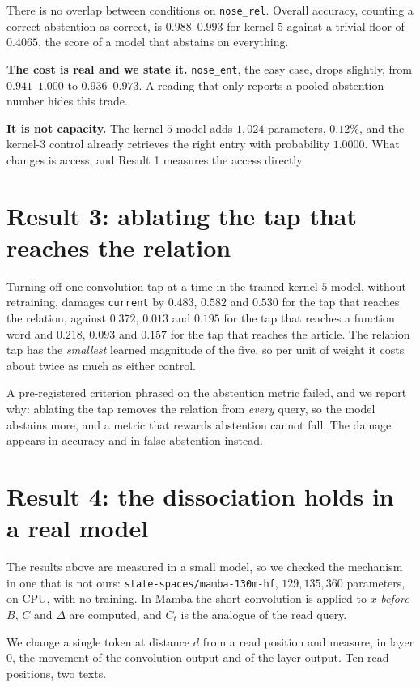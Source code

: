 \documentclass[10pt]{article}
\begin{document}
There is no overlap between conditions on \texttt{nose\_rel}. Overall accuracy, counting a correct
abstention as correct, is $0.988$--$0.993$ for kernel $5$ against a trivial floor of $0.4065$, the score
of a model that abstains on everything.

\textbf{The cost is real and we state it.} \texttt{nose\_ent}, the easy case, drops slightly, from
$0.941$--$1.000$ to $0.936$--$0.973$. A reading that only reports a pooled abstention number hides this
trade.

\textbf{It is not capacity.} The kernel-$5$ model adds $1{,}024$ parameters, $0.12\%$, and the kernel-$3$
control already retrieves the right entry with probability $1.0000$. What changes is access, and Result
1 measures the access directly.

\section{Result 3: ablating the tap that reaches the relation}

Turning off one convolution tap at a time in the trained kernel-$5$ model, without retraining, damages
\texttt{current} by $0.483$, $0.582$ and $0.530$ for the tap that reaches the relation, against $0.372$,
$0.013$ and $0.195$ for the tap that reaches a function word and $0.218$, $0.093$ and $0.157$ for the
tap that reaches the article. The relation tap has the \emph{smallest} learned magnitude of the five,
so per unit of weight it costs about twice as much as either control.

A pre-registered criterion phrased on the abstention metric failed, and we report why: ablating the tap
removes the relation from \emph{every} query, so the model abstains more, and a metric that rewards
abstention cannot fall. The damage appears in accuracy and in false abstention instead.

\section{Result 4: the dissociation holds in a real model}

The results above are measured in a small model, so we checked the mechanism in one that is not ours:
\texttt{state-spaces/mamba-130m-hf}, $129{,}135{,}360$ parameters, on CPU, with no training. In Mamba
the short convolution is applied to $x$ \emph{before} $B$, $C$ and $\Delta$ are computed, and $C_t$ is
the analogue of the read query.

We change a single token at distance $d$ from a read position and measure, in layer $0$, the movement
of the convolution output and of the layer output. Ten read positions, two texts.
\end{document}
